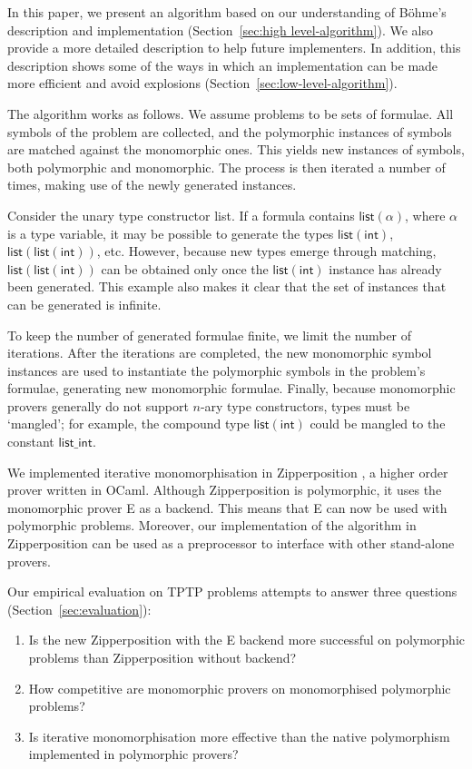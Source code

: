 \documentclass[]{ceurart}
\newcommand\ty[1]{\textsf{#1}}
\begin{document}
In this paper, we present an algorithm based on our understanding of Böhme's description and implementation (Section~\ref{sec:high level-algorithm}). We also provide a more detailed description to help future implementers. In addition, this description shows some of the ways in which an implementation can be made more efficient and avoid explosions (Section~\ref{sec:low-level-algorithm}).

The algorithm works as follows. We assume problems to be sets of formulae. All symbols of the problem are collected, and the polymorphic instances of symbols are matched against the monomorphic ones. This yields new instances of symbols, both polymorphic and monomorphic. The process is then iterated
a number of times, making use of the newly generated instances.

Consider the unary type constructor \ty{list}. If a formula contains $\ty{list}(\alpha)$, where $\alpha$ is a type variable, it may be possible to generate the types $\ty{list}(\ty{int})$, $\ty{list}(\ty{list}(\ty{int}))$, etc. However, because new types emerge through matching, $\ty{list}(\ty{list}(\ty{int}))$ can be obtained only once the $\ty{list}(\ty{int})$ instance has already been generated. This example also makes it clear that the set of instances that can be generated is infinite.

To keep the number of generated formulae finite, we limit the number of iterations. After the iterations are completed, the new monomorphic symbol instances are used to instantiate the polymorphic symbols in the problem's formulae, generating new monomorphic formulae. Finally, because monomorphic provers generally do not support $n$-ary type constructors, types must be `mangled'; for example, the compound type $\ty{list}(\ty{int})$ could be mangled to the constant $\ty{list\_int}$.

We implemented iterative monomorphisation in Zipperposition \cite{zipp}, a higher order prover written in OCaml. Although Zipperposition is polymorphic, it uses the monomorphic prover E \cite{e} as a backend. This means that E can now be used with polymorphic problems. Moreover, our implementation of the algorithm in Zipperposition can be used as a preprocessor to interface with other stand-alone provers.

Our empirical evaluation on TPTP \cite{tptp} problems attempts to answer three questions (Section~\ref{sec:evaluation}):
\begin{enumerate}
\item Is the new Zipperposition with the E backend more successful on polymorphic problems than Zipperposition without backend?

\item How competitive are monomorphic provers on monomorphised polymorphic problems?

\item Is iterative monomorphisation more effective than the native polymorphism implemented in polymorphic provers?
\end{enumerate}
\end{document}
